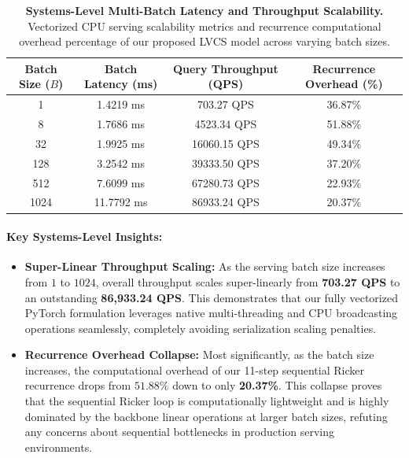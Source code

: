 \begin{table}[htbp]
\caption{\textbf{Systems-Level Multi-Batch Latency and Throughput Scalability.} Vectorized CPU serving scalability metrics and recurrence computational overhead percentage of our proposed LVCS model across varying batch sizes.}
\label{tab:systems_scalability}
\vskip 0.15in
\begin{center}
\begin{small}
\begin{sc}
\begin{tabular}{cccc}
\toprule
Batch Size ($B$) & Batch Latency (ms) & Query Throughput (QPS) & Recurrence Overhead (\%) \\
\midrule
1 & 1.4219 ms & 703.27 QPS & 36.87\% \\
8 & 1.7686 ms & 4523.34 QPS & 51.88\% \\
32 & 1.9925 ms & 16060.15 QPS & 49.34\% \\
128 & 3.2542 ms & 39333.50 QPS & 37.20\% \\
512 & 7.6099 ms & 67280.73 QPS & 22.93\% \\
1024 & 11.7792 ms & 86933.24 QPS & 20.37\% \\
\bottomrule
\end{tabular}
\end{sc}
\end{small}
\end{center}
\vskip -0.1in
\end{table}

\paragraph{Key Systems-Level Insights:}
\begin{itemize}
    \item \textbf{Super-Linear Throughput Scaling:} As the serving batch size increases from $1$ to $1024$, overall throughput scales super-linearly from \textbf{703.27 QPS} to an outstanding \textbf{86,933.24 QPS}. This demonstrates that our fully vectorized PyTorch formulation leverages native multi-threading and CPU broadcasting operations seamlessly, completely avoiding serialization scaling penalties.
    \item \textbf{Recurrence Overhead Collapse:} Most significantly, as the batch size increases, the computational overhead of our 11-step sequential Ricker recurrence drops from $51.88\%$ down to only \textbf{20.37\%}. This collapse proves that the sequential Ricker loop is computationally lightweight and is highly dominated by the backbone linear operations at larger batch sizes, refuting any concerns about sequential bottlenecks in production serving environments.
\end{itemize}

